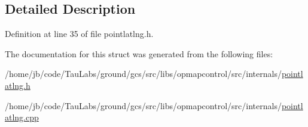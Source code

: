\subsection{\-Detailed \-Description}


\-Definition at line 35 of file pointlatlng.\-h.



\-The documentation for this struct was generated from the following files\-:\begin{DoxyCompactItemize}
\item 
/home/jb/code/\-Tau\-Labs/ground/gcs/src/libs/opmapcontrol/src/internals/\hyperlink{pointlatlng_8h}{pointlatlng.\-h}\item 
/home/jb/code/\-Tau\-Labs/ground/gcs/src/libs/opmapcontrol/src/internals/\hyperlink{pointlatlng_8cpp}{pointlatlng.\-cpp}\end{DoxyCompactItemize}
